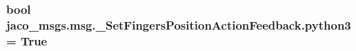 \subsubsection[{\texorpdfstring{python3}{python3}}]{\setlength{\rightskip}{0pt plus 5cm}bool jaco\+\_\+msgs.\+msg.\+\_\+\+Set\+Fingers\+Position\+Action\+Feedback.\+python3 = True}\hypertarget{namespacejaco__msgs_1_1msg_1_1__SetFingersPositionActionFeedback_a97679b60bf6747d0789e8d4d3c0a201d}{}\label{namespacejaco__msgs_1_1msg_1_1__SetFingersPositionActionFeedback_a97679b60bf6747d0789e8d4d3c0a201d}
